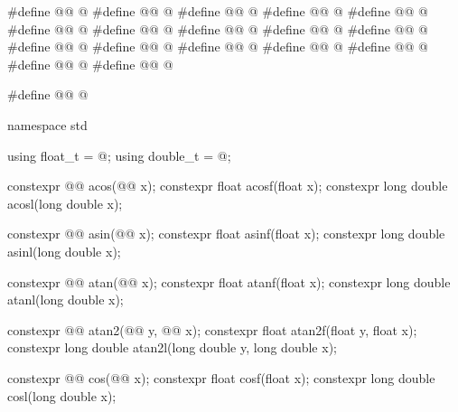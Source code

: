 %
%
%
%
%
%
%
%
%
%
%
%
\begin{codeblock}
#define @@ @\seebelow@
#define @@ @\seebelow@
#define @@ @\seebelow@
#define @@ @\seebelow@
#define @@ @\seebelow@
#define @@ @\seebelow@
#define @@ @\seebelow@
#define @@ @\seebelow@
#define @@ @\seebelow@
#define @@ @\seebelow@
#define @@ @\seebelow@
#define @@ @\seebelow@
#define @@ @\seebelow@
#define @@ @\seebelow@
#define @@ @\seebelow@
#define @@ @\seebelow@
#define @@ @\seebelow@

#define @@ @\seebelow@

namespace std {
  using float_t = @\seebelow@;
  using double_t = @\seebelow@;

  constexpr @@ acos(@@ x);
  constexpr float               acosf(float x);
  constexpr long double         acosl(long double x);

  constexpr @@ asin(@@ x);
  constexpr float               asinf(float x);
  constexpr long double         asinl(long double x);

  constexpr @@ atan(@@ x);
  constexpr float               atanf(float x);
  constexpr long double         atanl(long double x);

  constexpr @@ atan2(@@ y, @@ x);
  constexpr float               atan2f(float y, float x);
  constexpr long double         atan2l(long double y, long double x);

  constexpr @@ cos(@@ x);
  constexpr float               cosf(float x);
  constexpr long double         cosl(long double x);

}
\end{codeblock}
